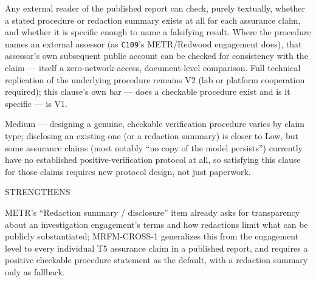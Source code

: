 \begin{description}[leftmargin=2.2cm, style=nextline]
\item[Verifier (no lab network access needed)] Any external reader of the published report can check, purely textually, whether a stated procedure or redaction summary exists at all for each assurance claim, and whether it is specific enough to name a falsifying result. Where the procedure names an external assessor (as \texttt{C109}'s METR/Redwood engagement does), that assessor's own subsequent public account can be checked for consistency with the claim --- itself a zero-network-access, document-level comparison. Full technical replication of the underlying procedure remains V2 (lab or platform cooperation required); this clause's own bar --- does a checkable procedure exist and is it specific --- is V1.
\item[Cost band] Medium --- designing a genuine, checkable verification procedure varies by claim type; disclosing an existing one (or a redaction summary) is closer to Low, but some assurance claims (most notably ``no copy of the model persists'') currently have no established positive-verification protocol at all, so satisfying this clause for those claims requires new protocol design, not just paperwork.
\item[vs. prior art] STRENGTHENS
\item[Prior-art note] METR's ``Redaction summary / disclosure'' item already asks for transparency about an investigation engagement's terms and how redactions limit what can be publicly substantiated; MRFM-CROSS-1 generalizes this from the engagement level to every individual T5 assurance claim in a published report, and requires a positive checkable procedure statement as the default, with a redaction summary only as fallback.
\end{description}

